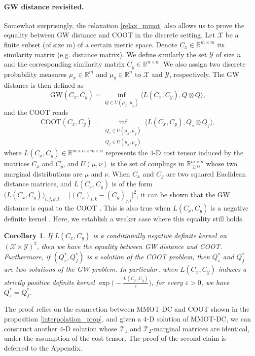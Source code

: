 \documentclass{article}
\newtheorem{corollary}[theorem]{Corollary}
\begin{document}
\paragraph{GW distance revisited.} Somewhat surprisingly, the relaxation \ref{relax_mmot} also allows us to prove the equality 
between GW distance and COOT in the discrete setting. Let $\mathcal X$ be a 
finite subset (of size $m$) of a certain metric space. Denote $C_x \in \mathbb R^{m \times m}$ its similarity matrix (e.g. distance 
matrix). We define similarly the set $\mathcal Y$ of size $n$ and the corresponding similarity matrix $C_y \in \mathbb R^{n \times n}$. 
We also assign two discrete probability measures $\mu_x \in \mathbb R^m$ and $\mu_y \in \mathbb R^n$ to $\mathcal X$ and $\mathcal Y$, 
respectively. The GW distance is then defined as
\begin{equation*}
  \text{GW}(C_x, C_y) = \inf_{Q \in U(\mu_x, \mu_y)} \langle L(C_x, C_y), Q \otimes Q \rangle,
\end{equation*}
and the COOT reads
\begin{equation*}
  \text{COOT}(C_x, C_y) = \inf_{\substack{Q_s \in U(\mu_x, \mu_y) \\ Q_f \in U(\mu_x, \mu_y)}} 
  \langle L(C_x, C_y), Q_s \otimes Q_f \rangle,
\end{equation*}
where $L(C_x,C_y) \in \mathbb R^{m \times n \times m \times n}$ represents the $4$-D cost tensor induced by the matrices $C_x$ and $C_y$, 
and $U(\mu, \nu)$ is the set of couplings in $\mathbb R^{m \times n}_{\geq 0}$ whose two marginal distributions are $\mu$ and
$\nu$. When $C_x$ and $C_y$ are two squared Euclidean distance matrices, and $L(C_x,C_y)$ is of the form 
$\big(L(C_x,C_y)\big)_{i,j,k,l} = \vert (C_x)_{i,k} - (C_y)_{j,l} \vert^2$, it can be shown that the GW distance is equal 
to the COOT \citep{Redko20}. This is also true when $L(C_x, C_y)$ is a negative definite kernel \cite{Sejourne20}. 
Here, we establish a weaker case where this equality still holds.
\begin{corollary} \label{kernel_gw_coot}
  If $L(C_x, C_y)$ is a conditionally negative definite kernel on $(\mathcal X \times \mathcal Y)^2$, then we have the equality 
  between GW distance and COOT. Furthermore, if $(Q_s^*,Q_f^*)$ is a solution of the COOT problem, then $Q_s^*$ and $Q_f^*$ are 
  two solutions of the GW problem. In particular, when $L(C_x, C_y)$ induces a strictly positive definite kernel 
  $\exp \big( -\frac{L(C_x, C_y)}{\varepsilon} \big)$, for every $\varepsilon > 0$, we have $Q_s^* = Q_f^*$.
\end{corollary}
The proof relies on the connection between MMOT-DC and COOT shown in the proposition \ref{interpolation_prop}, and given a 
$4$-D solution of MMOT-DC, we can construct another $4$-D solution whose $\mathcal T_1$ and $\mathcal T_2$-marginal matrices are 
identical, under the assumption of the cost tensor. The proof of the second claim is deferred to the Appendix.
\end{document}
